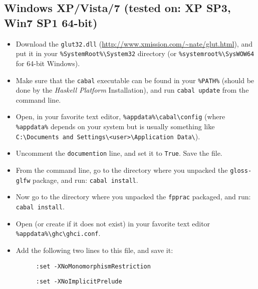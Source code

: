 \documentclass[]{article}
\begin{document}
\subsection{Windows XP/Vista/7 (tested on: XP SP3, Win7 SP1 64-bit)}
\begin{itemize}
  \item Download the \texttt{glut32.dll} (\url{http://www.xmission.com/~nate/glut.html}), and put it in your\newline{} \texttt{\%SystemRoot\%\textbackslash{}System32} directory (or \texttt{\%systemroot\%\textbackslash{}SysWOW64} for 64-bit Windows).
  \item Make sure that the \texttt{cabal} executable can be found in your \texttt{\%PATH\%} (should be done by the \emph{Haskell Platform} Installation), and run \texttt{cabal update} from the command line.
  \item Open, in your favorite text editor, \texttt{\%appdata\%\textbackslash{}cabal\textbackslash{}config} (where \texttt{\%appdata\%} depends on your system but is usually something like \texttt{C:\textbackslash{}Documents and Settings\textbackslash{}<user>\textbackslash{}Application Data\textbackslash{}}).
  \item Uncomment the \texttt{documention} line, and set it to \texttt{True}. Save the file.
  \item From the command line, go to the directory where you unpacked the \texttt{gloss-glfw} package, and run: \texttt{cabal install}.
  \item Now go to the directory where you unpacked the \texttt{fpprac} packaged, and run: \texttt{cabal install}.
  \item Open (or create if it does not exist) in your favorite text editor \texttt{\%appdata\%\textbackslash{}ghc\textbackslash{}ghci.conf}.
  \item Add the following two lines to this file, and save it:
  \begin{description}
    \item[] \texttt{:set -XNoMonomorphismRestriction}
    \item[] \texttt{:set -XNoImplicitPrelude}
  \end{description}
\end{itemize}
\end{document}
